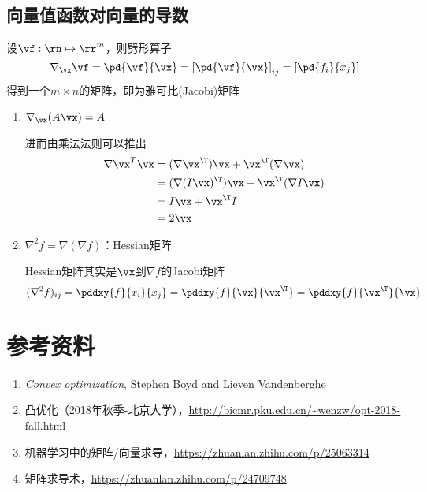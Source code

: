 \subsection{向量值函数对向量的导数}
设$\vf:\rn\mapsto\rr^m$，则劈形算子
\[\nabla_{\vx}\vf=\pd{\vf}{\vx}=\left[\pd{\vf}{\vx}\right]_{ij}=\left[\pd{f_i}{x_j}\right]\]
得到一个$m\times n$的矩阵，即为雅可比(Jacobi)矩阵
\begin{enumerate}
    \item $\nabla_\vx(A\vx)=A$
    \begin{analysis}
        进而由乘法法则可以推出
        \[\begin{aligned}
            \nabla\vx^T\vx&=(\nabla \vx^\T)\vx+\vx^\T(\nabla \vx)\\
            &=(\nabla (I\vx)^\T)\vx+\vx^\T(\nabla I\vx)\\
            &=I\vx+\vx^\T I\\
            &=2\vx
        \end{aligned}\]
    \end{analysis}
    \item $\nabla^2 f=\nabla(\nabla f)$：Hessian矩阵
    \begin{analysis}
        Hessian矩阵其实是$\vx$到$\nabla f$的Jacobi矩阵
        \[(\nabla^2 f)_{ij}=\pddxy{f}{x_i}{x_j}=\pddxy{f}{\vx}{\vx^\T}=\pddxy{f}{\vx^\T}{\vx}\]
    \end{analysis}
\end{enumerate}

\section{参考资料}
\begin{enumerate}
    \item \emph{Convex optimization}, Stephen Boyd and Lieven Vandenberghe
    \item 凸优化（2018年秋季-北京大学），\url{http://bicmr.pku.edu.cn/~wenzw/opt-2018-fall.html}
    \item 机器学习中的矩阵/向量求导，\url{https://zhuanlan.zhihu.com/p/25063314}
    \item 矩阵求导术，\url{https://zhuanlan.zhihu.com/p/24709748}
\end{enumerate}